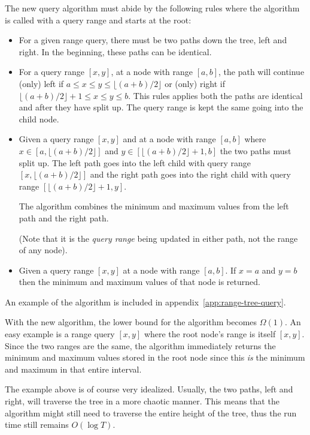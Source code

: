 The new query algorithm must abide by the following rules where the algorithm is
called with a query range and starts at the root:
\begin{itemize}
    \item For a given range query, there must be two paths down the tree, left
    and right. In the beginning, these paths can be identical. 

    \item For a query range $[x,y]$, at a node with range $[a,b]$, the path will
    continue (only) left if $a \leq x \leq y \leq \lfloor (a+b) / 2
    \rfloor$ or (only) right if $\lfloor (a+b) / 2 \rfloor + 1 \leq x \leq y \leq
    b$. This rules applies both the paths are identical and after they have
    split up. The query range is kept the same going into the child node. 

    \item Given a query range $[x,y]$ and at
    a node with range $[a,b]$ where $x \in [a,\lfloor (a+b) / 2 \rfloor]$ and $y
    \in [\lfloor (a+b) / 2 \rfloor + 1,b]$ the two paths must split up. The left
    path goes into the left child with query range $[x,\lfloor (a+b) / 2
    \rfloor]$ and the right path goes into the right child with query range
    $[\lfloor (a+b) / 2 \rfloor + 1,y]$. 

    The algorithm combines the minimum and maximum values from the left path and
    the right path. 

    (Note that it is the \textit{query range} being updated in either path, not
    the range of any node). 

    \item Given a query range $[x,y]$ at a node with range $[a,b]$. If $x = a$
    and $y = b$ then the minimum and maximum values of that node is returned. 
\end{itemize}
An example of the algorithm is included in
appendix~\ref{app:range-tree-query}. 

With the new algorithm, the lower bound for the algorithm becomes $\Omega(1)$.
An easy example is a range query $[x,y]$ where the root node's range is itself
$[x,y]$. Since the two ranges are the same, the algorithm immediately returns the
minimum and maximum values stored in the root node since this \textit{is} the
minimum and maximum in that entire interval. 

The example above is of course very idealized. Usually, the two paths,
left and right, will traverse the tree in a more chaotic manner. This means that
the algorithm might still need to traverse the entire height of the tree, thus
the run time still remains $O(\log T)$. 

